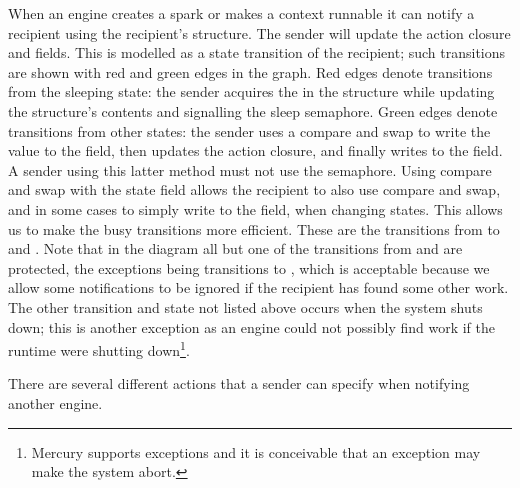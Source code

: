 When an engine creates a spark or makes a context runnable
it can notify a recipient using the recipient's
\enginesleepsync structure.
The sender will update the action closure and
 fields.
This is modelled as a state transition of the recipient;
such transitions are shown with red and green edges in the graph.
Red edges denote transitions from the sleeping state:
the sender acquires the  in the
\enginesleepsync structure while updating the structure's contents and
signalling the sleep semaphore.
Green edges denote transitions from other states:
the sender uses a compare and swap to write the  value to the
 field,
then updates the action closure,
and finally writes  to the  field.
A sender using this latter method must not use the semaphore.
Using compare and swap with the state field allows the recipient to also
use compare and swap, and in some cases to simply write to the field,
when changing states.
This allows us to make the busy transitions more efficient.
These are the transitions from
 to
 and
.
Note that in the diagram all but one of the transitions from
 and 
are protected,
the exceptions being transitions to ,
which is acceptable because we allow some notifications to be ignored if the
recipient has found some other work.
The other transition and state not listed above occurs when the system shuts
down;
this is another exception as an engine could not possibly find work if the
runtime were shutting down\footnote{
    Mercury supports exceptions and it is conceivable that an exception may
    make the system abort.
}.

There are several different actions that a sender can specify when notifying
another engine.

